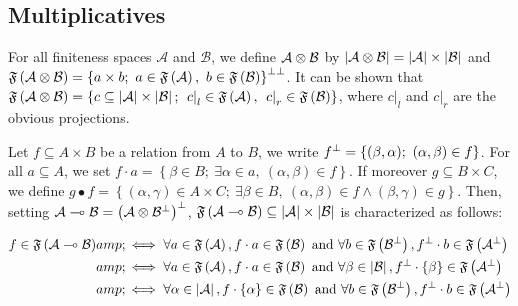 \subsection{Multiplicatives}\label{multiplicatives}

For all finiteness spaces \({\mathcal A}\) and \({\mathcal B}\), we
define \({\mathcal A} \otimes {\mathcal B}\) by
\(\left|{\mathcal A} \otimes {\mathcal B}\right| = \left|\mathcal A\right| \times \left|\mathcal B\right|\)
and
\(\mathfrak F\left({\mathcal A} \tens {\mathcal B}\right) = \left\{a\times b;\ a\in \mathfrak F\left(\mathcal A\right),\ b\in\mathfrak F\left(\mathcal B\right)\right\}\biorth\).
It can be shown that
\(\mathfrak F\left({\mathcal A} \otimes {\mathcal B}\right) = \left\{ c \subseteq \left|\mathcal A\right|\times\left|\mathcal B\right|;\  \left.c\right|_l\in \mathfrak F\left(\mathcal A\right),\ \left.c\right|_r\in\mathfrak F\left(\mathcal B\right)\right\}\),
where \(\left.c\right|_l\) and \(\left.c\right|_r\) are the obvious
projections.

Let \(f\subseteq A \times B\) be a relation from \(A\) to \(B\), we
write \(f^\bot=\left\{(\beta,\alpha);\  (\alpha,\beta)\in f\right\}\).
For all \(a\subseteq A\), we set
\(f\cdot a = \left\{\beta\in B;\  \exists \alpha\in a,\ (\alpha,\beta)\in f\right\}\).
If moreover \(g\subseteq B \times C\), we define
\(g \bullet f = \left\{(\alpha,\gamma)\in A\times C;\  \exists \beta\in B,\ (\alpha,\beta)\in f\wedge(\beta,\gamma)\in g\right\}\).
Then, setting
\({\mathcal A}\multimap{\mathcal B} = \left({\mathcal A}\otimes {\mathcal B}^\bot\right)^\bot\),
\(\mathfrak F\left({\mathcal A}\multimap{\mathcal B}\right)\subseteq {\left|\mathcal A\right|\times\left|\mathcal B\right|}\)
is characterized as follows:

\begin{align}
        f\in \mathfrak F\left({\mathcal A}\multimap{\mathcal B}\right) &amp;\iff \forall a\in \mathfrak F\left({\mathcal A}\right), f\cdot a \in\mathfrak F\left({\mathcal B}\right) \text{ and } \forall b\in \mathfrak F\left({\mathcal B}^\bot\right), f^\bot\cdot b \in\mathfrak F\left({\mathcal A}^\bot\right)
        \\
        &amp;\iff \forall a\in \mathfrak F\left({\mathcal A}\right), f\cdot a \in\mathfrak F\left({\mathcal B}\right) \text{ and } \forall \beta\in \left|{\mathcal B}\right|, f^\bot\cdot \left\{\beta\right\} \in\mathfrak F\left({\mathcal A}^\bot\right)
        \\
        &amp;\iff \forall \alpha\in \left|{\mathcal A}\right|, f\cdot \left\{\alpha\right\} \in\mathfrak F\left({\mathcal B}\right) \text{ and } \forall b\in \mathfrak F\left({\mathcal B}^\bot\right), f^\bot\cdot b \in\mathfrak F\left({\mathcal A}^\bot\right)
\end{align}


